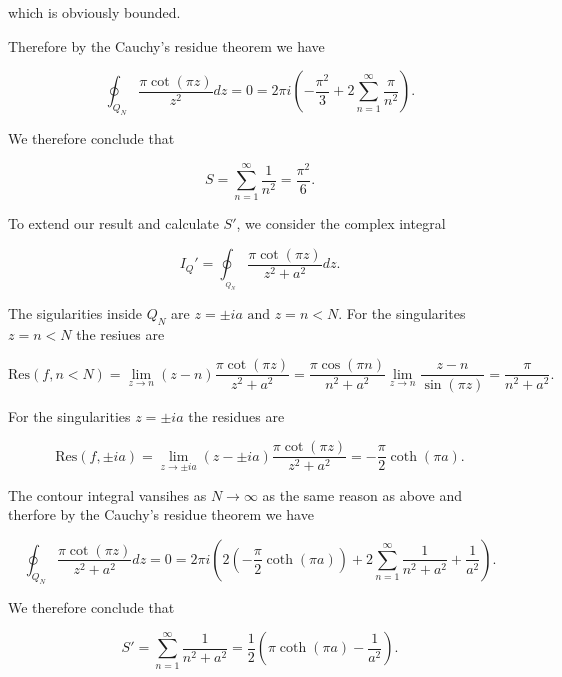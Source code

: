 \documentclass[english,a4paper,12pt]{report}
\begin{document}
{which is obviously bounded.

Therefore by the Cauchy's residue theorem we have 

\begin{equation}
    \oint_{Q_{N} }  \frac{\pi \cot (\pi z)}{z^2} dz = 0 = 2\pi i \left( -\frac{\pi ^2}{3} + 2 \sum_{n=1}^{\infty} \frac{\pi }{n^2}  \right).
\end{equation}

We therefore conclude that 

\begin{equation}
    S = \sum_{n=1}^{\infty} \frac{1}{n^2} = \frac{\pi ^2}{6}.   
\end{equation}

To extend our result and calculate \(S'\), we consider the complex integral 

\begin{equation}
    I_{Q}' = \oint_{_{Q_{N} } }  \frac{\pi \cot (\pi z)}{z^2+a^2}dz. 
\end{equation}

The sigularities inside \(Q_{N} \) are \(z = \pm ia \text { and } z = n < N\). For the singularites \(z = n < N\) the resiues are 

\begin{equation}
    \text{Res}(f,n<N) = \lim_{z \to n} (z-n)\frac{\pi \cot (\pi z)}{z^2+a^2} = \frac{\pi \cos (\pi n)}{n^2+a^2} \lim_{z \to n} \frac{z-n}{\sin (\pi z)} = \frac{\pi }{n^2+a^2}.   
\end{equation}

For the singularities \(z = \pm ia\) the residues are  

\begin{equation}
    \text{Res}(f,\pm ia) = \lim_{z \to \pm ia} (z-\pm ia) \frac{\pi \cot (\pi z)}{z^2+a^2} = -\frac{\pi }{2} \coth (\pi a). 
\end{equation}

The contour integral vansihes as \(N \to \infty\) as the same reason as above and therfore by the Cauchy's residue theorem we have

\begin{equation}
    \oint_{Q_{N} }\frac{\pi \cot (\pi z)}{z^2+a^2}dz = 0 = 2\pi i \left( 2 \left(-\frac{\pi }{2} \coth (\pi a) \right) + 2 \sum_{n=1}^{\infty} \frac{1}{n^2+a^2} + \frac{1}{a^2}   \right).  
\end{equation}

We therefore conclude that 

\begin{equation}
    S' = \sum_{n=1}^{\infty} \frac{1}{n^2+a^2} = \frac{1}{2}\left( \pi \coth(\pi a) - \frac{1}{a^2} \right). 
\end{equation}
~
} 
\end{document}
